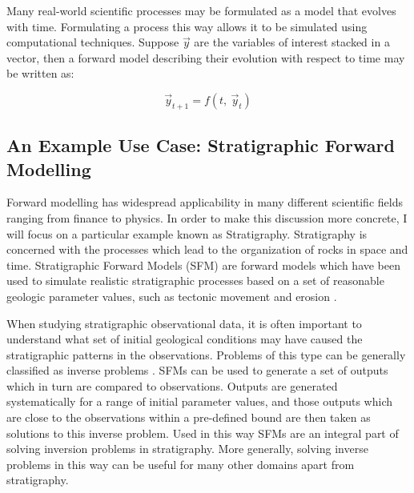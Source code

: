 \documentclass[12pt]{article}
\begin{document}
Many real-world scientific processes may be formulated as a model that evolves with time. Formulating a process this way allows it to be simulated using computational techniques. Suppose $\vec y$ are the variables of interest stacked in a vector, then a forward model describing their evolution with respect to time may be written as:

\begin{center}
	\begin{equation}
	\vec y_{t+1} = f(t, ~\vec y_t)
	\end{equation}
\end{center}


\subsection{An Example Use Case: Stratigraphic Forward Modelling}
Forward modelling has widespread applicability in many different scientific fields ranging from finance to physics. In order to make this discussion more concrete, I will focus on a particular example known as Stratigraphy. Stratigraphy is concerned with the processes which lead to the organization of rocks in space and time. Stratigraphic Forward Models (SFM) are forward models which have been used to simulate realistic stratigraphic processes based on a set of reasonable geologic parameter values, such as tectonic movement and erosion \cite{10.2110/pec.99.62.0069}.

When studying stratigraphic observational data, it is often important to understand what set of initial geological conditions may have caused the stratigraphic patterns in the observations. Problems of this type can be generally classified as inverse problems \cite{10.1260/0144598011492363}. SFMs can be used to generate a set of outputs which in turn are compared to observations. Outputs are generated systematically for a range of initial parameter values, and those outputs which are close to the observations within a pre-defined bound are then taken as solutions to this inverse problem. Used in this way SFMs are an integral part of solving inversion problems in stratigraphy. More generally, solving inverse problems in this way can be useful for many other domains apart from stratigraphy.
\end{document}
